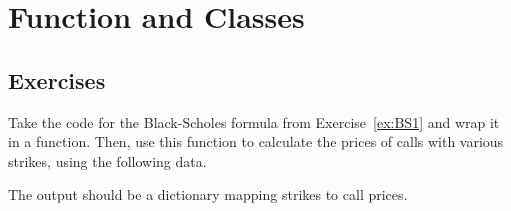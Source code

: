 \chapter{Function and Classes}\label{introduction-to-python---lesson-4}

\section{Exercises}

\begin{Exercise}[label={ex:BS2}]
Take the code for the Black-Scholes formula from Exercise~\ref{ex:BS1} and wrap it in a function. Then, use this function to calculate the prices of calls with various strikes, using the following data.

\begin{Shaded}
\end{Shaded}

The output should be a dictionary mapping strikes to call prices.
\end{Exercise}

